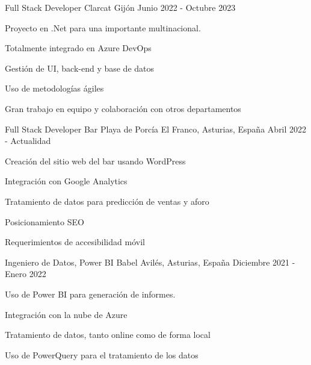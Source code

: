 \begin{cventries}
{\begin{cvitems}
        \end{cvitems}
    }
    \cventry
    {Full Stack Developer} %
    {Clarcat} %
    {Gijón} %
    {Junio 2022 - Octubre 2023} %
    {
        \begin{cvitems} %
            \item {Proyecto en .Net para una importante multinacional.}
            \item {Totalmente integrado en Azure DevOps}
            \item {Gestión de UI, back-end y base de datos}
            \item {Uso de metodologías ágiles}
            \item {Gran trabajo en equipo y colaboración con otros departamentos}
        \end{cvitems}
    }
    \cventry
    {Full Stack Developer} %
    {Bar Playa de Porcía} %
    {El Franco, Asturias, España} %
    {Abril 2022 - Actualidad} %
    {
        \begin{cvitems} %
            \item {Creación del sitio web del bar usando WordPress}
            \item {Integración con Google Analytics}
            \item {Tratamiento de datos para predicción de ventas y aforo}
            \item {Posicionamiento SEO}
            \item {Requerimientos de accesibilidad móvil}
        \end{cvitems}
    }

    \cventry
    {Ingeniero de Datos, Power BI} %
    {Babel} %
    {Avilés, Asturias, España} %
    {Diciembre 2021 - Enero 2022} %
    {
        \begin{cvitems} %
            \item {Uso de Power BI para generación de informes.}
            \item {Integración con la nube de Azure}
            \item {Tratamiento de datos, tanto online como de forma local}
            \item {Uso de PowerQuery para el tratamiento de los datos}
        \end{cvitems}
    }


\end{cventries}
